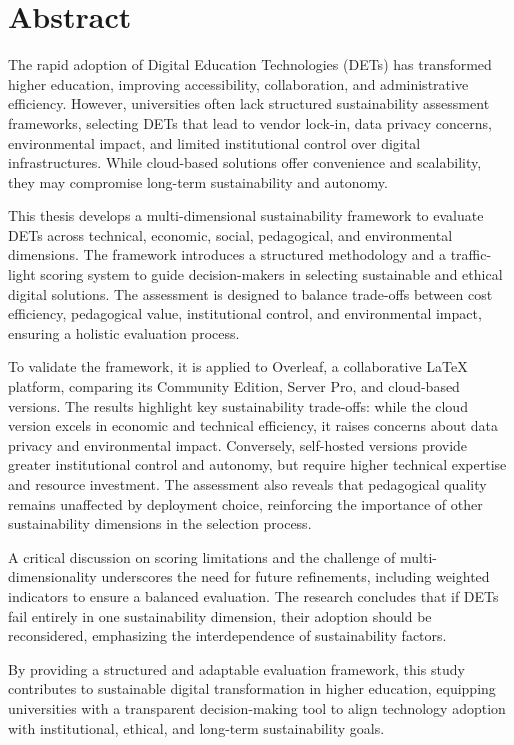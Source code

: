 \chapter*{Abstract} %
\label{abtract}


\bigskip

The rapid adoption of Digital Education Technologies (DETs) has transformed higher education, improving accessibility, collaboration, and administrative efficiency. However, universities often lack structured sustainability assessment frameworks, selecting DETs that lead to vendor lock-in, data privacy concerns, environmental impact, and limited institutional control over digital infrastructures. While cloud-based solutions offer convenience and scalability, they may compromise long-term sustainability and autonomy.

This thesis develops a multi-dimensional sustainability framework to evaluate DETs across technical, economic, social, pedagogical, and environmental dimensions. The framework introduces a structured methodology and a traffic-light scoring system to guide decision-makers in selecting sustainable and ethical digital solutions. The assessment is designed to balance trade-offs between cost efficiency, pedagogical value, institutional control, and environmental impact, ensuring a holistic evaluation process.

To validate the framework, it is applied to Overleaf, a collaborative LaTeX platform, comparing its Community Edition, Server Pro, and cloud-based versions. The results highlight key sustainability trade-offs: while the cloud version excels in economic and technical efficiency, it raises concerns about data privacy and environmental impact. Conversely, self-hosted versions provide greater institutional control and autonomy, but require higher technical expertise and resource investment. The assessment also reveals that pedagogical quality remains unaffected by deployment choice, reinforcing the importance of other sustainability dimensions in the selection process.

A critical discussion on scoring limitations and the challenge of multi-dimensionality underscores the need for future refinements, including weighted indicators to ensure a balanced evaluation. The research concludes that if DETs fail entirely in one sustainability dimension, their adoption should be reconsidered, emphasizing the interdependence of sustainability factors.

By providing a structured and adaptable evaluation framework, this study contributes to sustainable digital transformation in higher education, equipping universities with a transparent decision-making tool to align technology adoption with institutional, ethical, and long-term sustainability goals.




